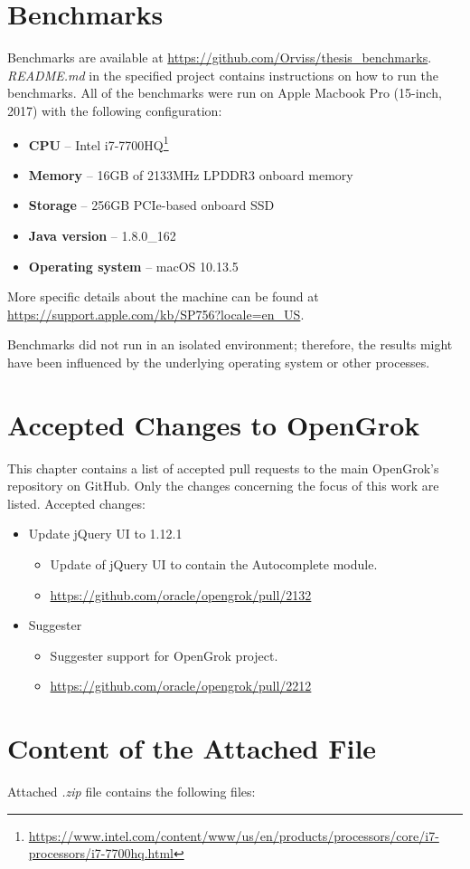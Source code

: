\chapter{Benchmarks}
\label{benchmark_attachment}

Benchmarks are available at \url{https://github.com/Orviss/thesis_benchmarks}. \textit{README.md} in the specified project
contains instructions on how to run the benchmarks. All of the benchmarks were run on Apple Macbook Pro (15-inch, 2017)
with the following configuration:
\begin{itemize}
    \item \textbf{CPU} – Intel i7-7700HQ\footnote{\url{https://www.intel.com/content/www/us/en/products/processors/core/i7-processors/i7-7700hq.html}}
    \item \textbf{Memory} – 16GB of 2133MHz LPDDR3 onboard memory
    \item \textbf{Storage} – 256GB PCIe-based onboard SSD
    \item \textbf{Java version} – 1.8.0\_162
    \item \textbf{Operating system} – macOS 10.13.5
\end{itemize}

More specific details about the machine can be found at \url{https://support.apple.com/kb/SP756?locale=en_US}.

Benchmarks did not run in an isolated environment; therefore, the results might have been influenced by the underlying
operating system or other processes.

\chapter{Accepted Changes to OpenGrok}
This chapter contains a list of accepted pull requests to the main OpenGrok's repository on GitHub. Only the changes
concerning the focus of this work are listed.
Accepted changes:
\begin{itemize}
    \item Update jQuery UI to 1.12.1
    \begin{itemize}
        \item Update of jQuery UI to contain the Autocomplete module.
        \item \url{https://github.com/oracle/opengrok/pull/2132}
    \end{itemize}
    \item Suggester
    \begin{itemize}
        \item Suggester support for OpenGrok project.
        \item \url{https://github.com/oracle/opengrok/pull/2212}
    \end{itemize}
\end{itemize}

\chapter{Content of the Attached File}
Attached \textit{.zip} file contains the following files:
\bigskip
{}
